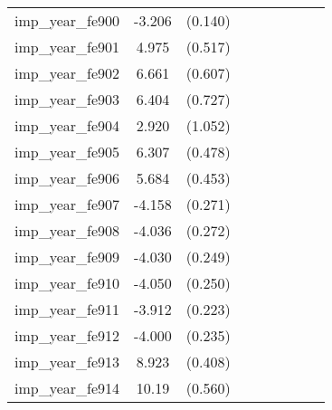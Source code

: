{\begin{tabular}{l*{4}{cc}}
imp\_year\_fe900&   -3.206\sym{***}&  (0.140)&                  &         &                  &         &                  &         \\
imp\_year\_fe901&    4.975\sym{***}&  (0.517)&                  &         &                  &         &                  &         \\
imp\_year\_fe902&    6.661\sym{***}&  (0.607)&                  &         &                  &         &                  &         \\
imp\_year\_fe903&    6.404\sym{***}&  (0.727)&                  &         &                  &         &                  &         \\
imp\_year\_fe904&    2.920\sym{**} &  (1.052)&                  &         &                  &         &                  &         \\
imp\_year\_fe905&    6.307\sym{***}&  (0.478)&                  &         &                  &         &                  &         \\
imp\_year\_fe906&    5.684\sym{***}&  (0.453)&                  &         &                  &         &                  &         \\
imp\_year\_fe907&   -4.158\sym{***}&  (0.271)&                  &         &                  &         &                  &         \\
imp\_year\_fe908&   -4.036\sym{***}&  (0.272)&                  &         &                  &         &                  &         \\
imp\_year\_fe909&   -4.030\sym{***}&  (0.249)&                  &         &                  &         &                  &         \\
imp\_year\_fe910&   -4.050\sym{***}&  (0.250)&                  &         &                  &         &                  &         \\
imp\_year\_fe911&   -3.912\sym{***}&  (0.223)&                  &         &                  &         &                  &         \\
imp\_year\_fe912&   -4.000\sym{***}&  (0.235)&                  &         &                  &         &                  &         \\
imp\_year\_fe913&    8.923\sym{***}&  (0.408)&                  &         &                  &         &                  &         \\
imp\_year\_fe914&    10.19\sym{***}&  (0.560)&                  &         &                  &         &                  &         \\

\end{tabular}}
